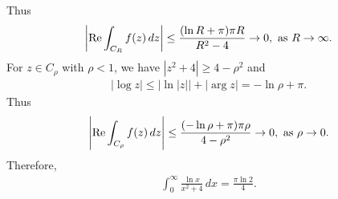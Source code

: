 \begin{problem}
\begin{solution}
Thus 
\begin{align*}
    \left\lvert \operatorname{Re} \int_{C_R} f(z) \,dz\right\rvert \le \frac{(\ln R+\pi)\pi R}{R^2 - 4} \to 0, \text{ as } R \to \infty.
\end{align*}
For $z \in C_\rho$ with $\rho < 1$, we have $|z^2 + 4| \ge 4-\rho^2$ and 
\begin{align*}
    |\log z| \le |\ln |z|| + |\arg z| = -\ln \rho + \pi.
\end{align*}
Thus 
\begin{align*}
    \left\lvert \operatorname{Re} \int_{C_\rho} f(z) \,dz\right\rvert \le \frac{(-\ln\rho +\pi) \pi \rho}{4-\rho^2} \to 0, \text{ as } \rho \to 0.
\end{align*}
Therefore,
\begin{align*}
    \int_0^\infty \frac{\ln x}{x^2 + 4} \,dx = \frac{\pi\ln 2}{4}.
\end{align*}
\end{solution}
\end{problem}
